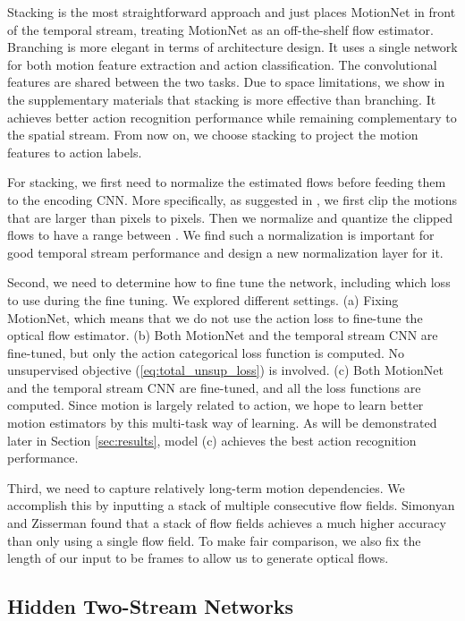 \documentclass[runningheads]{llncs}
\begin{document}
		Stacking is the most straightforward approach and just places MotionNet in front of the temporal stream, treating MotionNet as an off-the-shelf flow estimator. Branching is more elegant in terms of architecture design. It uses a single network for both motion feature extraction and action classification. The convolutional features are shared between the two tasks. Due to space limitations, we show in the supplementary materials that stacking is more effective than branching. It achieves better action recognition performance while remaining complementary to the spatial stream. From now on, we choose stacking to project the motion features to action labels.
		
		For stacking, we first need to normalize the estimated flows before feeding them to the encoding CNN. More specifically, as suggested in \cite{twostream2014}, we first clip the motions that are larger than  pixels to  pixels. Then we normalize and quantize the clipped flows to have a range between . We find such a normalization is important for good temporal stream performance and design a new normalization layer for it. 
		
		Second, we need to determine how to fine tune the network, including which loss to use during the fine tuning. We explored different settings. (a) Fixing MotionNet, which means that we do not use the action loss to fine-tune the optical flow estimator. (b) Both MotionNet and the temporal stream CNN are fine-tuned, but only the action categorical loss function is computed. No unsupervised objective (\ref{eq:total_unsup_loss}) is involved. (c) Both MotionNet and the temporal stream CNN are fine-tuned, and all the loss functions are computed. Since motion is largely related to action, we hope to learn better motion estimators by this multi-task way of learning. As will be demonstrated later in Section \ref{sec:results}, model (c) achieves the best action recognition performance. 
		
		Third, we need to capture relatively long-term motion dependencies. We accomplish this by inputting a stack of multiple consecutive flow fields. Simonyan and Zisserman \cite{twostream2014} found that a stack of  flow fields achieves a much higher accuracy than only using a single flow field. To make fair comparison, we also fix the length of our input to be  frames to allow us to generate  optical flows.
		
		\subsection{Hidden Two-Stream Networks}
		\label{sec:hidden}
		
\end{document}
